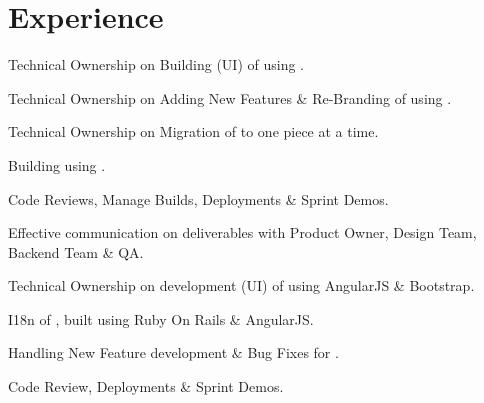 \documentclass[]{my-resume-openfont}
\begin{document}
\hfill
\begin{minipage}[t]{0.66\textwidth}


\section{Experience}

\vspace{\topsep} %
\begin{tightemize}
\item{Technical Ownership on Building (UI) of \href{https://tools.wordstream.com/google-grader?my-email@email.com}{}using .}
\item{Technical Ownership on Adding New Features \& Re-Branding of using .}
\item{Technical Ownership on Migration of to  one piece at a time.}
\item{Building using .}
\item{Code Reviews, Manage Builds, Deployments \& Sprint Demos.}
\item{Effective communication on deliverables with Product Owner, Design Team, Backend Team \& QA.}
\end{tightemize}
\sectionsep

\begin{tightemize}
\item{Technical Ownership on development (UI) of  using AngularJS \& Bootstrap.}
\item{I18n of , built using Ruby On Rails \& AngularJS.}
\item{Handling New Feature development \& Bug Fixes for .}
\item{Code Review, Deployments \& Sprint Demos.}
\end{tightemize}
\sectionsep


\end{minipage}
\end{document}
